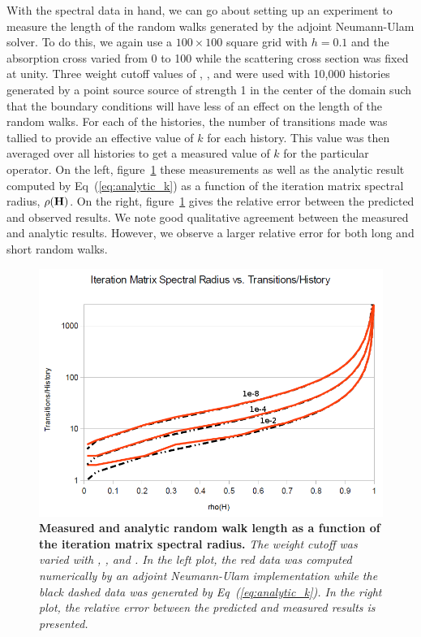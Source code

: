 \documentclass{mc2013}
\begin{document}
With the spectral data in hand, we can go about setting up an
experiment to measure the length of the random walks generated by the
adjoint Neumann-Ulam solver. To do this, we again use a $100 \times
100$ square grid with $h=0.1$ and the absorption cross varied from 0
to 100 while the scattering cross section was fixed at unity. Three
weight cutoff values of , , and  were
used with 10,000 histories generated by a point source source of
strength 1 in the center of the domain such that the boundary
conditions will have less of an effect on the length of the random
walks. For each of the histories, the number of transitions made was
tallied to provide an effective value of $k$ for each history. This
value was then averaged over all histories to get a measured value of
$k$ for the particular operator. On the left,
figure~\ref{fig:measured_length} these measurements as well as the
analytic result computed by Eq~(\ref{eq:analytic_k}) as a function of
the iteration matrix spectral radius, $\rho(\mathbf{H})$. On the right,
figure~\ref{fig:measured_length} gives the relative error between the
predicted and observed results. We note good qualitative agreement
between the measured and analytic results. However, we observe a
larger relative error for both long and short random walks.
\begin{figure}[ht!]
  \begin{spacing}{1.0}
    \begin{center}
      \includegraphics[width=6.5in,clip]{measured_length.png}
    \end{center}
    \caption{\textbf{Measured and analytic random walk length as a
        function of the iteration matrix spectral radius.} \textit{The
        weight cutoff was varied with , , and
        . In the left plot, the red data was computed
        numerically by an adjoint Neumann-Ulam implementation while
        the black dashed data was generated by
        Eq~(\ref{eq:analytic_k}). In the right plot, the relative
        error between the predicted and measured results is
        presented.}}
    \label{fig:measured_length}
  \end{spacing}
\end{figure}
\end{document}
